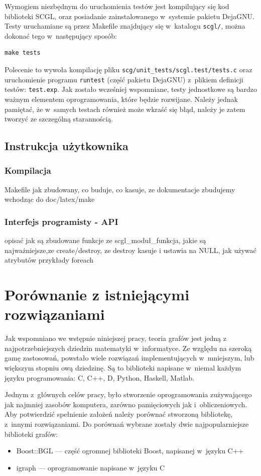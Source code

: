 \documentclass[a4paper,12pt,polish,oneside]{thesis}
\newcommand\code[1]{\lstinline[style=line]{#1}}
\begin{document}
Wymogiem niezbędnym do uruchomienia testów jest kompilujący się kod biblioteki SCGL, oraz posiadanie zainstalowanego w~systemie pakietu DejaGNU.
Testy uruchamiane są przez Makefile znajdujący się w~katalogu \code{scgl/}, można dokonać tego w~następujący sposób:
\begin{lstlisting}[style=coden]
make tests
\end{lstlisting}
Polecenie to wywoła kompilację pliku \code{scg/unit_tests/scgl.test/tests.c} oraz uruchomienie programu \code{runtest} (część pakietu DejaGNU) z~plikiem definicji testów: \code{test.exp}.
Jak zostało wcześniej wspomniane, testy jednostkowe są bardzo ważnym elementem oprogramowania, które będzie rozwijane.
Należy jednak pamiętać, że w~samych testach również może wkraść się błąd, należy je zatem tworzyć ze szczególną starannością.

\section{Instrukcja użytkownika}
\subsection{Kompilacja}
\label{chap:make}
Makefile jak zbudowany, co buduje, co kasuje, ze dokumentacje zbudujemy wchodząc do doc/latex/make 
\subsection{Interfejs programisty - API}
opisać jak są zbudowane funkcje ze scgl\_moduł\_funkcja, jakie są najważniejsze,ze create/destroy, ze destroy kasuje i ustawia na NULL, jak używać atrybutów przykłady foreach 

\chapter{Porównanie z istniejącymi rozwiązaniami}
\label{chap:tests}
Jak wspomniano we wstępnie niniejszej pracy, teoria grafów jest jedną z najpotrzebniejszych dziedzin matematyki w~informatyce.
Ze względu na szeroką gamę zastosowań, powstało wiele rozwiązań implementujących w~mniejszym, lub większym stopniu ową dziedzinę.
Są to biblioteki napisane w~niemal każdym języku programowania: C, C++, D, Python, Haskell, Matlab.

Jednym z~głównych celów pracy, było stworzenie oprogramowania zużywającego jak najmniej zasobów komputera, zarówno pamięciowych jak i~obliczeniowych.
Aby potwierdzić spełnienie założeń należy porównać stworzoną bibliotekę, z~innymi rozwiązaniami.
Do porównań wybrane zostały dwie najpopularniejsze biblioteki grafów:
\begin{itemize}
	\item Boost::BGL --- część ogromnej biblioteki Boost, napisanej w~języku C++
	\item igraph --- oprogramowanie napisane w~języku C
\end{itemize}
\end{document}
